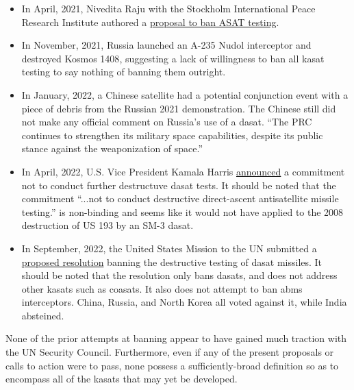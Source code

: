 \begin{itemize}

\item In April, 2021, Nivedita Raju with the Stockholm International
  Peace Research Institute authored a
  \href{https://www.sipri.org/sites/default/files/2021-04/eunpdc_no_74.pdf}{
    proposal to ban ASAT testing}.\cite{eu-ban}

\item In November, 2021, Russia launched an A-235 Nudol interceptor
  and destroyed Kosmos 1408\cite{brian}, suggesting a lack of
  willingness to ban all \ac{kasat} testing to say nothing of banning
  them outright.

\item In January, 2022, a Chinese satellite had a potential
  conjunction event with a piece of debris from the Russian 2021
  demonstration.\cite{mums-the-china} The Chinese still did not make
  any official comment on Russia's use of a
  \ac{dasat}.\cite{mums-the-china} ``The PRC continues to strengthen
  its military space capabilities, despite its public stance against
  the weaponization of space.''\cite[p66]{osd-china-21}

\item In April, 2022, U.S. Vice President Kamala Harris
  \href{https://www.youtube.com/watch?v=ZANjCHvSEpM}{announced} a
  commitment not to conduct further destructuve \ac{dasat}
  tests.\cite{kamala-pinky-swears} It should be noted that the
  commitment ``...not to conduct destructive direct-ascent
  antisatellite missile testing.'' is non-binding and seems like it
  would not have applied to the 2008 destruction of US 193 by an SM-3
  \ac{dasat}.

\item In September, 2022, the United States Mission to the UN
  submitted a
  \href{https://uploads.mwp.mprod.getusinfo.com/uploads/sites/25/2022/09/US-ASAT-Documents-1-1.pdf}{proposed
    resolution} banning the destructive testing of \ac{dasat}
  missiles.\cite{un-asat-me-not} It should be noted that the
  resolution only bans \aclp{dasat}, and does not address other
  \aclp{kasat} such as \aclp{coasat}.\cite{un-asat-me-not} It also
  does not attempt to ban \acp{abm} interceptors.\cite{un-asat-me-not}
  China, Russia, and North Korea all voted against it, while India
  absteined.\cite{not-so-chinese}

\end{itemize}


None of the prior attempts at banning appear to have gained much
traction with the UN Security Council.  Furthermore, even if any of
the present proposals or calls to action were to pass, none possess a
sufficiently-broad definition so as to encompass all of the
\acp{kasat} that may yet be developed.

